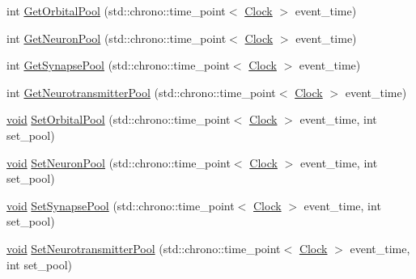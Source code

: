 \begin{DoxyCompactItemize}
\item 
int \mbox{\hyperlink{class_cognitive_network_af5995eaa4ba35c555a6b65d895451f25}{Get\+Orbital\+Pool}} (std\+::chrono\+::time\+\_\+point$<$ \mbox{\hyperlink{universe_8h_a0ef8d951d1ca5ab3cfaf7ab4c7a6fd80}{Clock}} $>$ event\+\_\+time)
\item 
int \mbox{\hyperlink{class_cognitive_network_af81132245e486c496a055f54a5a520d0}{Get\+Neuron\+Pool}} (std\+::chrono\+::time\+\_\+point$<$ \mbox{\hyperlink{universe_8h_a0ef8d951d1ca5ab3cfaf7ab4c7a6fd80}{Clock}} $>$ event\+\_\+time)
\item 
int \mbox{\hyperlink{class_cognitive_network_ae0068b9df823e1b10fed3c73f1cb4702}{Get\+Synapse\+Pool}} (std\+::chrono\+::time\+\_\+point$<$ \mbox{\hyperlink{universe_8h_a0ef8d951d1ca5ab3cfaf7ab4c7a6fd80}{Clock}} $>$ event\+\_\+time)
\item 
int \mbox{\hyperlink{class_cognitive_network_a4e5b1d60cda4ddb4bd04d8dca42b7a5b}{Get\+Neurotransmitter\+Pool}} (std\+::chrono\+::time\+\_\+point$<$ \mbox{\hyperlink{universe_8h_a0ef8d951d1ca5ab3cfaf7ab4c7a6fd80}{Clock}} $>$ event\+\_\+time)
\item 
\mbox{\hyperlink{glad_8h_a950fc91edb4504f62f1c577bf4727c29}{void}} \mbox{\hyperlink{class_cognitive_network_aeee6e2b2eb06b3c55a0f019b6c9cc250}{Set\+Orbital\+Pool}} (std\+::chrono\+::time\+\_\+point$<$ \mbox{\hyperlink{universe_8h_a0ef8d951d1ca5ab3cfaf7ab4c7a6fd80}{Clock}} $>$ event\+\_\+time, int set\+\_\+pool)
\item 
\mbox{\hyperlink{glad_8h_a950fc91edb4504f62f1c577bf4727c29}{void}} \mbox{\hyperlink{class_cognitive_network_a2e1137387c4165dd3f91a758d2ce7f34}{Set\+Neuron\+Pool}} (std\+::chrono\+::time\+\_\+point$<$ \mbox{\hyperlink{universe_8h_a0ef8d951d1ca5ab3cfaf7ab4c7a6fd80}{Clock}} $>$ event\+\_\+time, int set\+\_\+pool)
\item 
\mbox{\hyperlink{glad_8h_a950fc91edb4504f62f1c577bf4727c29}{void}} \mbox{\hyperlink{class_cognitive_network_a9d2b7d1de9e7148a403fc15f7f3fd1bf}{Set\+Synapse\+Pool}} (std\+::chrono\+::time\+\_\+point$<$ \mbox{\hyperlink{universe_8h_a0ef8d951d1ca5ab3cfaf7ab4c7a6fd80}{Clock}} $>$ event\+\_\+time, int set\+\_\+pool)
\item 
\mbox{\hyperlink{glad_8h_a950fc91edb4504f62f1c577bf4727c29}{void}} \mbox{\hyperlink{class_cognitive_network_a84f808251f67ced0edad2e1dd4d47039}{Set\+Neurotransmitter\+Pool}} (std\+::chrono\+::time\+\_\+point$<$ \mbox{\hyperlink{universe_8h_a0ef8d951d1ca5ab3cfaf7ab4c7a6fd80}{Clock}} $>$ event\+\_\+time, int set\+\_\+pool)
\item 

\end{DoxyCompactItemize}
